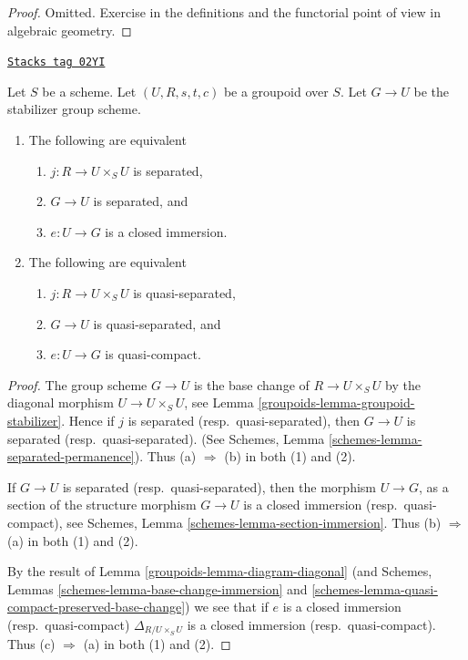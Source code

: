 \begin{proof}
Omitted.
Exercise in the definitions and the functorial point of
view in algebraic geometry.
\end{proof}

\begin{lemma}[Diagonal]
\label{groupoids-lemma-diagonal}
\href{https://stacks.math.columbia.edu/tag/02YI}{\texttt{Stacks tag 02YI}}

Let $S$ be a scheme.
Let $(U, R, s, t, c)$ be a groupoid over $S$.
Let $G \to U$ be the stabilizer group scheme.
\begin{enumerate}
\item The following are equivalent
\begin{enumerate}
\item $j : R \to U \times_S U$ is separated,
\item $G \to U$ is separated, and
\item $e : U \to G$ is a closed immersion.
\end{enumerate}
\item The following are equivalent
\begin{enumerate}
\item $j : R \to U \times_S U$ is quasi-separated,
\item $G \to U$ is quasi-separated, and
\item $e : U \to G$ is quasi-compact.
\end{enumerate}
\end{enumerate}
\end{lemma}

\begin{proof}

The group scheme $G \to U$ is the base change of $R \to U \times_S U$
by the diagonal morphism $U \to U \times_S U$, see
Lemma \ref{groupoids-lemma-groupoid-stabilizer}. Hence if
$j$ is separated (resp.\ quasi-separated),
then $G \to U$ is separated (resp.\ quasi-separated).
(See Schemes, Lemma
\ref{schemes-lemma-separated-permanence}).
Thus (a) $\Rightarrow$ (b) in both (1) and (2).

\medskip\noindent
If $G \to U$ is separated (resp.\ quasi-separated), then the morphism
$U \to G$, as a section of the structure morphism $G \to U$ is a closed
immersion (resp.\ quasi-compact), see
Schemes, Lemma \ref{schemes-lemma-section-immersion}.
Thus (b) $\Rightarrow$ (a) in both (1) and (2).

\medskip\noindent
By the result of
Lemma \ref{groupoids-lemma-diagram-diagonal}
(and Schemes, Lemmas \ref{schemes-lemma-base-change-immersion}
and \ref{schemes-lemma-quasi-compact-preserved-base-change})
we see that if $e$ is a closed immersion (resp.\ quasi-compact)
$\Delta_{R/U \times_S U}$ is a closed
immersion (resp.\ quasi-compact).
Thus (c) $\Rightarrow$ (a) in both (1) and (2).
\end{proof}

